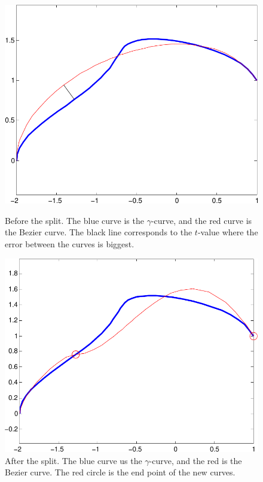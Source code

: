 \documentclass[10pt]{article}
\begin{document}
\begin{figure}
\centering
\begin{minipage}[t]{.45\textwidth}
\centering
\vspace{0pt}
    \includegraphics[scale=0.5]{kurvedeling1-crop.pdf}
    \caption{Before the split. The blue curve is the $\gamma$-curve, and the red curve is the Bezier curve. The black line corresponds to the $t$-value where the error between the curves is biggest.}
    \label{fig:kurvedeling1}
\end{minipage}\hfill
\begin{minipage}[t]{.45\textwidth}
\vspace{0pt}
    \includegraphics[scale=0.5]{kurvedeling2-crop.pdf}
    \caption{After the split. The blue curve us the $\gamma$-curve, and the red is the Bezier curve. The red circle is the end point of the new curves.}
    \label{fig:kurvedeling2}
\end{minipage}
\end{figure}
\end{document}
